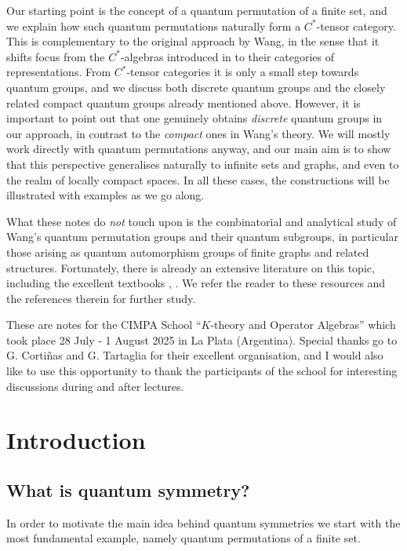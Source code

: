 \documentclass[a4paper]{amsart}
\numberwithin{equation}{section}
\theoremstyle{change}
\begin{document}
Our starting point is the concept of a quantum permutation of a finite set, and we explain how such quantum permutations 
naturally form a $ C^* $-tensor category. This is complementary to the original approach by Wang, in the sense that it shifts focus from the $ C^* $-algebras introduced in \cite{WANG_quantumsymmetry} to their categories of representations. From $ C^* $-tensor categories it is only 
a small step towards quantum groups, and we discuss both discrete quantum groups and the closely related compact quantum groups already mentioned above. However, it is important to point out that one genuinely obtains \emph{discrete} quantum groups in our approach, in contrast to the \emph{compact} ones in Wang's theory. 
We will mostly work directly with quantum permutations anyway, and our main aim is to show that this perspective generalises naturally to infinite sets and graphs, and even to the realm of locally compact spaces. In all these cases, the  constructions will be illustrated with examples as we go along. 

What these notes do \emph{not} touch upon is the combinatorial and analytical study of Wang's quantum permutation groups and their quantum subgroups, in particular those arising as quantum automorphism groups of finite graphs and related structures. Fortunately, there is already an extensive literature on this topic, including the excellent textbooks \cite{BANICA_quantumpermutationgroups}, \cite{FRESLON_compactquantumgroupscombinatorics}. We refer the reader to these resources and the references therein for further study. 

These are notes for the CIMPA School ``$ K $-theory and Operator Algebras'' which took place 28 July - 1 August 2025 in La Plata (Argentina). Special thanks go to G. Corti\~nas and G. Tartaglia for their excellent organisation, and I would also like to use this opportunity to thank the participants of the school for interesting discussions during and after lectures. 


\section{Introduction} \label{sec_introduction}

\subsection{What is quantum symmetry?} 

In order to motivate the main idea behind quantum symmetries we start with the most fundamental example, namely quantum permutations of a finite set. 
\end{document}
